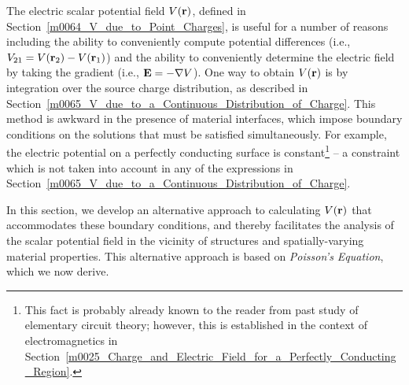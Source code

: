 

\label{m0067_Poissons_and_Laplaces_Equations} %

The electric scalar potential field $V({\bf r})$, defined in Section~\ref{m0064_V_due_to_Point_Charges}, is useful for a number of reasons including 
the ability to conveniently compute potential differences
(i.e., $V_{21} = V({\bf r}_2) - V({\bf r}_1)$)
and the ability to conveniently determine the electric field by taking the gradient
(i.e., ${\bf E}=-\nabla V$).  
One way to obtain $V({\bf r})$ is by integration over the source charge distribution, as described in Section~\ref{m0065_V_due_to_a_Continuous_Distribution_of_Charge}.
This method is awkward in the presence of material interfaces, which impose boundary conditions on the solutions that must be satisfied simultaneously.  
For example, the electric potential on a perfectly conducting surface is constant\footnote{This fact is probably already known to the reader from past study of elementary circuit theory; however, this is established in the context of electromagnetics in Section~\ref{m0025_Charge_and_Electric_Field_for_a_Perfectly_Conducting_Region}.} 
-- a constraint which is not taken into account in any of the expressions in Section~\ref{m0065_V_due_to_a_Continuous_Distribution_of_Charge}.

In this section, we develop an alternative approach to calculating $V({\bf r})$ that accommodates these boundary conditions, and thereby facilitates the analysis of the scalar potential field in the vicinity of structures and spatially-varying material properties.
This alternative approach is based on \emph{Poisson's Equation}, which we now derive. 

